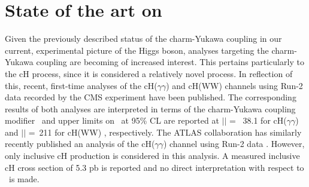 \section{State of the art on \kappac}
\label{SOAkappac}
Given the previously described status of the charm-Yukawa coupling in our current, experimental picture of the Higgs boson, analyses targeting the charm-Yukawa coupling are becoming of increased interest. This pertains particularly to the cH process, since it is considered a relatively novel process. In reflection of this, recent, first-time analyses of the cH($\gamma\gamma$) and cH(WW) channels using Run-2 data recorded by the CMS experiment have been published. The corresponding results of both analyses are interpreted in terms of the charm-Yukawa coupling modifier \kappac\, and upper limits on \kappac \, at 95\% CL are reported at $\mid$\kappac$\mid$ = \, 38.1 for cH($\gamma\gamma$) \cite{cmscHgammgamma} and $\mid$\kappac$\mid$ = \,211 for cH(WW) \cite{cmscHWW}, respectively. The ATLAS collaboration has similarly recently published an analysis of the cH($\gamma\gamma$) channel using Run-2 data \cite{cHATLAS}. However, only inclusive cH production is considered in this analysis. A measured inclusive cH cross section of 5.3 pb is reported and no direct interpretation with respect to \kappac\ is made. \\
\\
